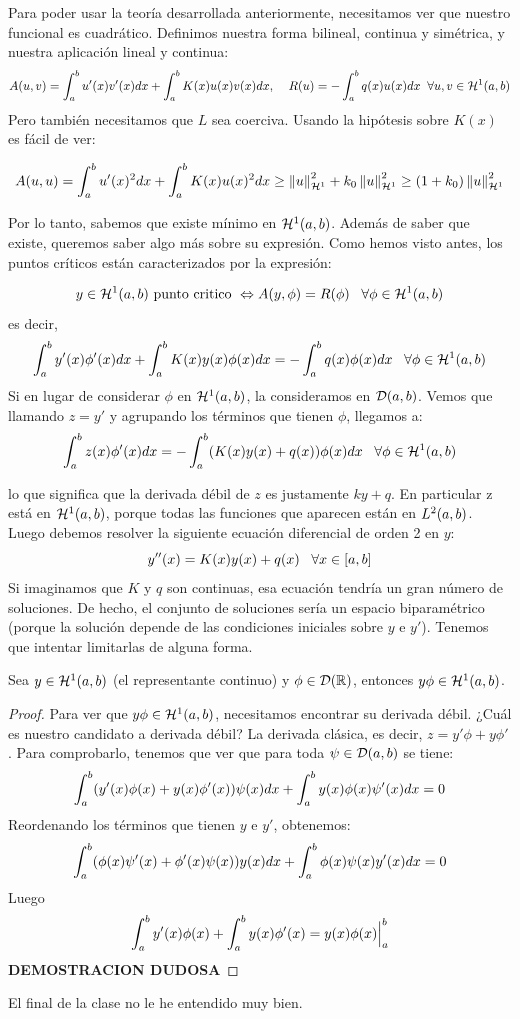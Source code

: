 Para poder usar la teoría desarrollada anteriormente, necesitamos ver que nuestro funcional es cuadrático. Definimos nuestra forma bilineal, continua y simétrica, y nuestra aplicación lineal y continua:
\[
A(u,v)=\integral{a}{b}{u'(x)v'(x)dx}+\integral{a}{b}{K(x)u(x)v(x)dx}, \; \espacio R(u)=-\integral{a}{b}{q(x)u(x)dx} \;\;\forall u,v\in\sobolev{1}
\]
Pero también necesitamos que $L$ sea coerciva. Usando la hipótesis sobre $K(x)$ es fácil de ver:


\[
A(u,u)=\integral{a}{b}{u'(x)^2dx}+\integral{a}{b}{K(x)u(x)^2dx}\geq\normasobolev{1}{u}^2+k_0\normasobolev{1}{u}^2\geq(1+k_0)\normasobolev{1}{u}^2
\]

Por lo tanto, sabemos que existe mínimo en $\sobolev{1}$. Además de saber que existe, queremos saber algo más sobre su expresión. Como hemos visto antes, los puntos críticos están caracterizados por la expresión:

\[
y\in\sobolev{1} \text{ punto critico } \Leftrightarrow A(y,\phi)=R(\phi) \espacio \forall \phi\in\sobolev{1}
\]
es decir,
\[
\integral{a}{b}{y'(x)\phi'(x)dx}+\integral{a}{b}{K(x)y(x)\phi(x)dx}=-\integral{a}{b}{q(x)\phi(x)dx} \espacio  \forall\phi\in\sobolev{1}
\]
Si en lugar de considerar $\phi$ en $\sobolev{1}$, la consideramos en $\soportecompacto$. Vemos que llamando $z=y'$ y agrupando los términos que tienen $\phi$, llegamos a:
\[
\integral{a}{b}{z(x)\phi'(x)dx}=-\integral{a}{b}{(K(x)y(x)+q(x))\phi(x)dx} \espacio  \forall\phi\in\sobolev{1}
\]

lo que significa que la derivada débil de $z$ es justamente $ky+q$. En particular z está en $\sobolev{1}$, porque todas las funciones que aparecen están en $\lebesgue{2}$. Luego debemos resolver la siguiente ecuación diferencial de orden 2 en $y$:
\[
y''(x)=K(x)y(x)+q(x) \espacio \forall x \in[a,b]
\]
Si imaginamos que $K$ y $q$ son continuas, esa ecuación tendría un gran número de soluciones. De hecho, el conjunto de soluciones sería un espacio biparamétrico (porque la solución depende de las condiciones iniciales sobre $y$ e $y'$). Tenemos que intentar limitarlas de alguna forma.

\begin{prop}
Sea $y\in\sobolev{1}$ (el representante continuo) y $\phi\in\mathcal{D}(\R)$, entonces $y\phi\in\sobolev{1}$.
\end{prop}
\begin{proof}
Para ver que $y\phi\in\sobolev{1}$, necesitamos encontrar su derivada débil. ¿Cuál es nuestro candidato a derivada débil? La derivada clásica, es decir, $z=y'\phi+y\phi'$. Para comprobarlo, tenemos que ver que para toda $\psi\in\soportecompacto$ se tiene:
\[
\integral{a}{b}{(y'(x)\phi(x)+y(x)\phi'(x))\psi(x)dx}+\integral{a}{b}{y(x)\phi(x)\psi'(x)dx}=0
\]
Reordenando los términos que tienen $y$ e $y'$, obtenemos:
\[
\integral{a}{b}{(\phi(x)\psi'(x)+\phi'(x)\psi(x))y(x)dx}+\integral{a}{b}{\phi(x)\psi(x)y'(x)dx}=0
\]
Luego
\[
\integral{a}{b}{y'(x)\phi(x)}+\integral{a}{b}{y(x)\phi'(x)}=y(x)\phi(x)\Big|^b_a
\] 
\textbf{DEMOSTRACION DUDOSA}
\end{proof}
El final de la clase no le he entendido muy bien.

